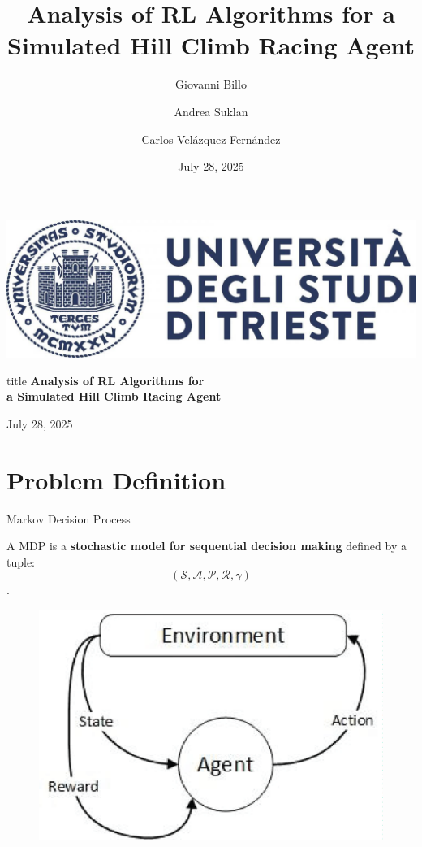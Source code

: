 \documentclass[serif]{beamer}  %
\author{
    Giovanni Billo
    \and  
    Andrea Suklan
    \and  
    Carlos Velázquez Fernández
}
\title{Analysis of RL Algorithms for a Simulated Hill Climb Racing Agent}
\date{\small July 28, 2025}
\begin{document}
\begin{frame}
    \vfill
    \begin{center}
        \includegraphics[keepaspectratio, scale=0.15]{images/logo.jpg}
        \vspace{1cm}
        \begin{beamercolorbox}[wd=\textwidth,center,rounded=true]{title}
            \textbf{Analysis of RL Algorithms for \\ a Simulated Hill Climb Racing Agent}
        \end{beamercolorbox}
        \vspace{1cm}
        {July 28, 2025}
    \end{center}
    \vfill
\end{frame} 

\begin{frame}    
\tableofcontents[sectionstyle=show,
subsectionstyle=show/shaded/hide,
subsubsectionstyle=show/shaded/hide]
\end{frame}

\section{Problem Definition}

    \begin{frame}{Markov Decision Process}

    A MDP is a \textbf{stochastic model for sequential decision making} defined by a tuple: $$(\mathcal{S}, \mathcal{A}, \mathcal{P}, \mathcal{R}, \gamma)$$.

    \begin{figure}
            \centering
            \includegraphics[width=0.65\linewidth]{presentation/images/md.png}
    \end{figure}
        
    \end{frame}
\end{document}
